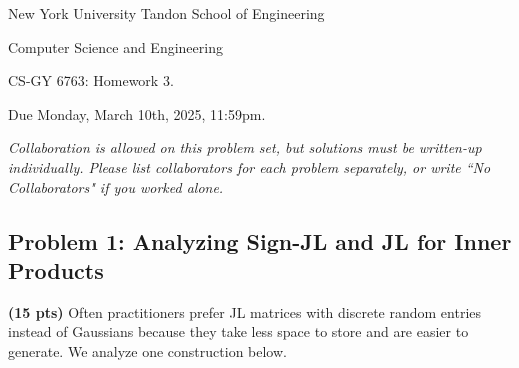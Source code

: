 \documentclass[10pt]{article}
\begin{document}
	
\begin{center}
	\normalsize
	New York University Tandon School of Engineering
	
	Computer Science and Engineering
	\medskip
	
	\large
	CS-GY 6763: Homework 3. 
	
	Due Monday, March 10th, 2025, 11:59pm.
	\medskip
	
	\normalsize 
	\noindent \emph{Collaboration is allowed on this problem set, but solutions must be written-up individually. Please list collaborators for each problem separately, or write ``No Collaborators" if you worked alone.}
	\medskip
\end{center} 

\subsection{Problem 1: Analyzing Sign-JL and JL for Inner Products} 
\textbf{(15 pts)} Often practitioners prefer JL matrices with discrete random entries instead of Gaussians because they take less space to store and are easier to generate. We  analyze one construction below.
\end{document}
